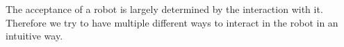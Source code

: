 The acceptance of a robot is largely determined by the interaction with it. Therefore we try to have multiple different ways to interact in the robot in an intuitive way.
 
